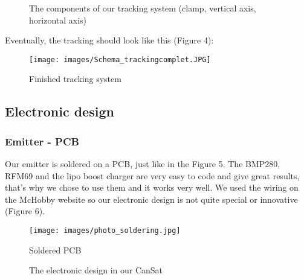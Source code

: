 \documentclass[]{article}
\begin{document}
\begin{figure}[h]
    \centering
    \hfill
    \hfill
    \caption{The components of our tracking system (clamp, vertical axis, horizontal axis)}
\end{figure}

\newpage

Eventually, the tracking should look like this (Figure 4): 

\begin{figure}[h] 
    \centering
    \texttt{[image: images/Schema\_trackingcomplet.JPG]} 
    \caption{Finished tracking system}
\end{figure}

\subsection{Electronic design}

\subsubsection{Emitter - PCB}

Our emitter is soldered on a PCB, just like in the Figure 5. The BMP280, RFM69 and the lipo boost charger
are very easy to code and give great results, that's why we chose to use them and it works very well. We used the wiring
on the McHobby website so our electronic design is not quite special or innovative (Figure 6). 

\begin{figure}[h] 
    \centering
    \texttt{[image: images/photo\_soldering.jpg]} 
    \caption{Soldered PCB}
\end{figure}

\vspace{2em}

\begin{figure}[h]
    \centering
    \hfill
    \hfill
    \caption{The electronic design in our CanSat}
\end{figure}
\end{document}
